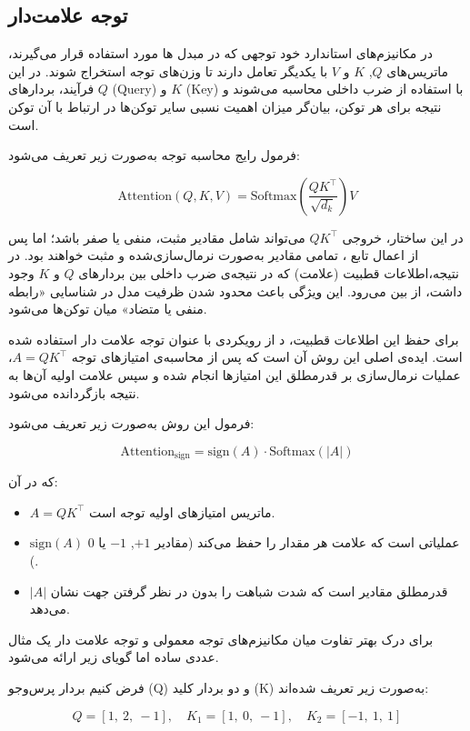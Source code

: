 \subsection{توجه علامت‌دار}

در مکانیزم‌های استاندارد خود توجهی که در مبدل ها مورد استفاده قرار می‌گیرند، ماتریس‌های $Q$, $K$ و $V$ با یکدیگر تعامل دارند تا وزن‌های توجه استخراج شوند. در این فرآیند، بردارهای $Q$ (Query) و $K$ (Key) با استفاده از ضرب داخلی محاسبه می‌شوند و نتیجه برای هر توکن، بیان‌گر میزان اهمیت نسبی سایر توکن‌ها در ارتباط با آن توکن است.

فرمول رایج محاسبه توجه به‌صورت زیر تعریف می‌شود:

\[
\text{Attention}(Q, K, V) = \text{Softmax}\left( \frac{QK^\top}{\sqrt{d_k}} \right) V
\]

در این ساختار، خروجی $QK^\top$ می‌تواند شامل مقادیر مثبت، منفی یا صفر باشد؛ اما پس از اعمال تابع ، تمامی مقادیر به‌صورت نرمال‌سازی‌شده و مثبت خواهند بود. در نتیجه،اطلاعات قطبیت (علامت) که در نتیجه‌ی ضرب داخلی بین بردارهای $Q$ و $K$ وجود داشت، از بین می‌رود. این ویژگی باعث محدود شدن ظرفیت مدل در شناسایی «رابطه منفی یا متضاد» میان توکن‌ها می‌شود.

برای حفظ این اطلاعات قطبیت، د از رویکردی با عنوان  توجه علامت دار استفاده شده است. ایده‌ی اصلی این روش آن است که پس از محاسبه‌ی امتیازهای توجه $A = QK^\top$، عملیات نرمال‌سازی  بر قدرمطلق این امتیازها انجام شده و سپس علامت اولیه آن‌ها به نتیجه بازگردانده می‌شود.

فرمول این روش به‌صورت زیر تعریف می‌شود:

\[
\text{Attention}_{\text{sign}} = \text{sign}(A) \cdot \text{Softmax}(|A|)
\]

که در آن:
\begin{itemize}
	\item $A = QK^\top$ ماتریس امتیازهای اولیه توجه است.
	\item $\text{sign}(A)$ عملیاتی است که علامت هر مقدار را حفظ می‌کند (مقادیر $+1$, $-1$ یا $0$).
	\item $|A|$ قدرمطلق مقادیر است که شدت شباهت را بدون در نظر گرفتن جهت نشان می‌دهد.
\end{itemize}


برای درک بهتر تفاوت میان مکانیزم‌های توجه معمولی و توجه علامت دار یک مثال عددی ساده اما گویای زیر ارائه می‌شود.

فرض کنیم  بردار پرس‌وجو (Q) و دو بردار کلید (K) به‌صورت زیر تعریف شده‌اند:

\[
Q = [1,\ 2,\ -1], \quad
K_1 = [1,\ 0,\ -1], \quad
K_2 = [-1,\ 1,\ 1]
\]

